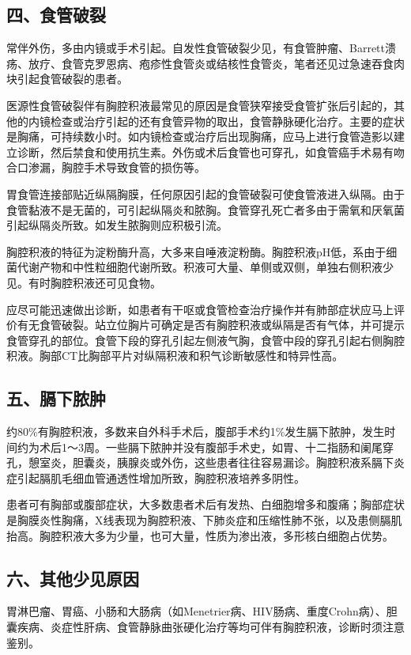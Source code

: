 \subsection{四、食管破裂}

常伴外伤，多由内镜或手术引起。自发性食管破裂少见，有食管肿瘤、Barrett溃疡、放疗、食管克罗恩病、疱疹性食管炎或结核性食管炎，笔者还见过急速吞食肉块引起食管破裂的患者。

医源性食管破裂伴有胸腔积液最常见的原因是食管狭窄接受食管扩张后引起的，其他的内镜检查或治疗引起的还有食管异物的取出，食管静脉硬化治疗。主要的症状是胸痛，可持续数小时。如内镜检查或治疗后出现胸痛，应马上进行食管造影以建立诊断，然后禁食和使用抗生素。外伤或术后食管也可穿孔，如食管癌手术易有吻合口渗漏，胸腔手术导致食管的损伤等。

胃食管连接部贴近纵隔胸膜，任何原因引起的食管破裂可使食管液进入纵隔。由于食管黏液不是无菌的，可引起纵隔炎和脓胸。食管穿孔死亡者多由于需氧和厌氧菌引起纵隔炎所致。如发生脓胸则应积极引流。

胸腔积液的特征为淀粉酶升高，大多来自唾液淀粉酶。胸腔积液pH低，系由于细菌代谢产物和中性粒细胞代谢所致。积液可大量、单侧或双侧，单独右侧积液少见。有时胸腔积液还可见食物。

应尽可能迅速做出诊断，如患者有干呕或食管检查治疗操作并有肺部症状应马上评价有无食管破裂。站立位胸片可确定是否有胸腔积液或纵隔是否有气体，并可提示食管穿孔的部位。食管下段的穿孔引起左侧液气胸，食管中段的穿孔引起右侧胸腔积液。胸部CT比胸部平片对纵隔积液和积气诊断敏感性和特异性高。

\subsection{五、膈下脓肿}

约80\%有胸腔积液，多数来自外科手术后，腹部手术约1\%发生膈下脓肿，发生时间约为术后1～3周。一些膈下脓肿并没有腹部手术史，如胃、十二指肠和阑尾穿孔，憩室炎，胆囊炎，胰腺炎或外伤，这些患者往往容易漏诊。胸腔积液系膈下炎症引起膈肌毛细血管通透性增加所致，胸腔积液培养多阴性。

患者可有胸部或腹部症状，大多数患者术后有发热、白细胞增多和腹痛；胸部症状是胸膜炎性胸痛，X线表现为胸腔积液、下肺炎症和压缩性肺不张，以及患侧膈肌抬高。胸腔积液大多为少量，也可大量，性质为渗出液，多形核白细胞占优势。

\subsection{六、其他少见原因}

胃淋巴瘤、胃癌、小肠和大肠病（如Menetrier病、HIV肠病、重度Crohn病）、胆囊疾病、炎症性肝病、食管静脉曲张硬化治疗等均可伴有胸腔积液，诊断时须注意鉴别。

